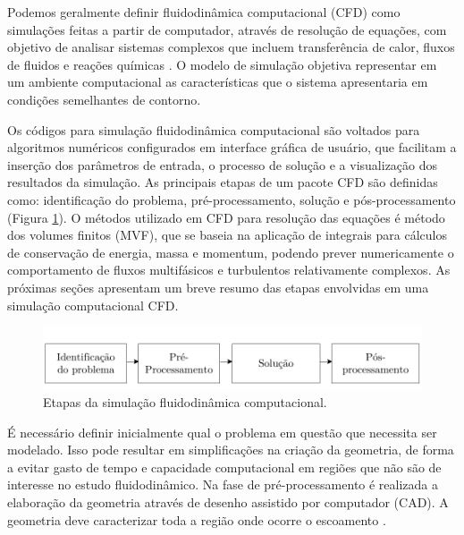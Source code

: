 Podemos geralmente definir fluidodinâmica computacional (CFD) como simulações feitas a partir de computador, através de resolução de equações, com objetivo de analisar sistemas complexos que incluem transferência de calor, fluxos de fluidos e reações químicas \cite{versteeg}. O modelo de simulação objetiva representar em um ambiente computacional as características que o sistema apresentaria em condições semelhantes de contorno. 


Os códigos para simulação fluidodinâmica computacional são voltados para algoritmos numéricos configurados em interface gráfica de usuário, que facilitam a inserção dos parâmetros de entrada, o processo de solução e a visualização dos resultados da simulação. As principais etapas de um pacote CFD são definidas como: identificação do problema, pré-processamento, solução e pós-processamento (Figura \ref{fig:etapascfd}). O métodos utilizado em CFD para resolução das equações é método dos volumes finitos (MVF), que se baseia na aplicação de integrais para cálculos de conservação de energia, massa e momentum, podendo prever numericamente o comportamento de fluxos multifásicos e turbulentos relativamente complexos.  As próximas seções apresentam um breve resumo das etapas envolvidas em uma simulação computacional CFD.

\begin{figure}[H]
    \centering
    \includegraphics{Figuras/cfd.pdf}
    \caption{Etapas da simulação fluidodinâmica computacional.}
    \label{fig:etapascfd}
\end{figure}

É necessário definir inicialmente qual o problema em questão que necessita ser modelado. Isso pode resultar em simplificações na criação da geometria, de forma a evitar gasto de tempo e capacidade computacional em regiões que não são de interesse no estudo fluidodinâmico. Na fase de pré-processamento é realizada a elaboração da geometria através de desenho assistido por computador (CAD). A geometria deve caracterizar toda a região onde ocorre o escoamento \cite{petrila}.

